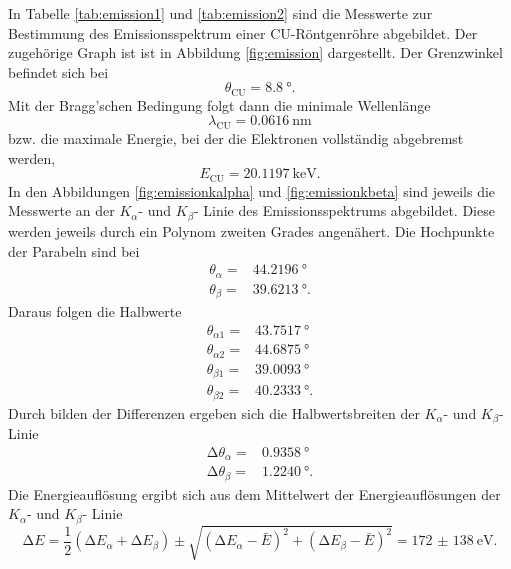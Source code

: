 In Tabelle \ref{tab:emission1} und \ref{tab:emission2} sind die Messwerte zur
Bestimmung des
Emissionsspektrum einer CU-Röntgenröhre abgebildet. Der zugehörige Graph ist
ist in Abbildung \ref{fig:emission} dargestellt.
Der Grenzwinkel befindet sich bei
\begin{equation}
  \theta_\text{CU} = \SI{8.8}{\degree}.
\end{equation}
Mit der Bragg'schen Bedingung folgt dann die minimale Wellenlänge
\begin{equation}
  \lambda_\text{CU} = \SI{0.0616}{\nano\meter}
\end{equation}
bzw. die maximale Energie, bei der die Elektronen vollständig abgebremst werden,
\begin{equation}
  E_\text{CU} = \SI{20.1197}{\kilo\electronvolt}.
\end{equation}
In den Abbildungen \ref{fig:emissionkalpha} und \ref{fig:emissionkbeta} sind
jeweils die Messwerte an der $K_\alpha$- und $K_\beta$- Linie des
Emissionsspektrums abgebildet. Diese werden jeweils durch ein Polynom zweiten
Grades angenähert.
Die Hochpunkte der Parabeln sind bei
\begin{align}
  \theta_\alpha = & \SI{44.2196}{\degree} \\
  \theta_\beta = & \SI{39.6213}{\degree}.
\end{align}
Daraus folgen die Halbwerte
\begin{align}
  \theta_{\alpha 1} = & \SI{43.7517}{\degree} \\
  \theta_{\alpha 2} = & \SI{44.6875}{\degree} \\
  \theta_{\beta 1} = & \SI{39.0093}{\degree} \\
  \theta_{\beta 2} = & \SI{40.2333}{\degree}.
\end{align}
Durch bilden der Differenzen ergeben sich die Halbwertsbreiten der
$K_\alpha$- und $K_\beta$- Linie
\begin{align}
  \increment \theta_\alpha = & \SI{0.9358}{\degree} \\
  \increment \theta_\beta = & \SI{1.2240}{\degree}.
\end{align}
Die Energieauflösung ergibt sich aus dem Mittelwert der Energieauflösungen
der $K_\alpha$- und $K_\beta$- Linie
\begin{equation}
  \increment E = \frac{1}{2}(\increment E_\alpha + \increment E_\beta) \pm
  \sqrt{(\increment E_\alpha - \bar{E})^2 + (\increment E_\beta - \bar{E})^2}
  = \SI{172(138)}{\electronvolt}.
\end{equation}


